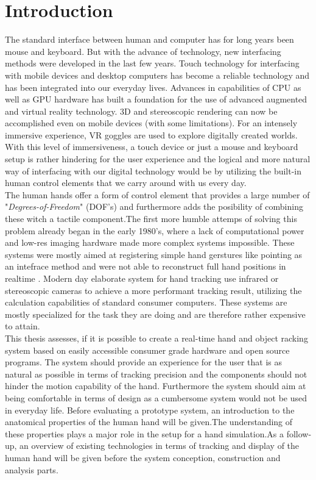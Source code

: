\chapter{Introduction}
The standard interface between human and computer has for long years been mouse and keyboard. But with the advance of technology, new interfacing methods were developed in the last few years.
Touch technology for interfacing with mobile devices and desktop computers has become a reliable technology and has been integrated into our everyday lives.
Advances in capabilities of CPU as well as GPU hardware has built a foundation for the use of advanced augmented and virtual reality technology. 3D and stereoscopic rendering can now be accomplished even on mobile devices (with some limitations). For an intensely immersive experience, VR goggles are used to explore digitally created worlds.\\
With this level of immersiveness, a touch device or just a mouse and keyboard setup is rather hindering for the user experience and the logical and more natural way of interfacing with our digital technology would be by utilizing the built-in human control elements that we carry around with us every day.\\ The human hands offer a form of control element that provides a large number of "\textit{Degrees-of-Freedom}" (DOF's) and furthermore adds the posibility of combining these witch a tactile component.The first more humble attemps of solving this problem already began in the early 1980's, where a lack of computational power and low-res imaging hardware made more complex systems impossible. These systems were mostly aimed at registering simple hand gerstures like pointing as an intefrace method and were not able to reconstruct full hand positions in realtime \cite{Bolt.1980}. Modern day elaborate system for hand tracking use infrared or stereoscopic cameras to achieve a  more performant tracking result, utilizing the calculation capabilities of standard consumer computers. These systems are mostly specialized for the task they are doing and are therefore rather expensive to attain. \\
This thesis assesses, if it is possible to create a real-time hand and object racking system based on easily accessible consumer grade hardware and open source programs. The system should provide an experience for the user that is as natural as possible in terms of tracking precision and the components should not hinder the motion capability of the hand. Furthermore the system should aim at being comfortable in terms of design as a cumbersome system would not be used  in everyday life.
Before evaluating a prototype system, an introduction to the anatomical properties of the human hand will be given.The understanding of these properties plays a major role in the setup for a hand simulation.As a follow-up, an overview of existing technologies in terms of tracking and display of the human hand will be given before the system conception, construction and analysis parts.

